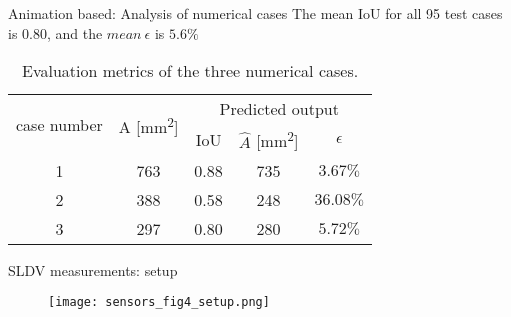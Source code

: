 \documentclass[10pt,aspectratio=169,dvipsnames]{beamer} %
\begin{document}
	\begin{frame}{Animation based: Analysis of numerical cases}
		The mean IoU for all 95 test cases is 0.80, and the \(mean\ \epsilon\) is \(5.6\%\)
		\begin{table}[!h]
			\centering
			\caption{Evaluation metrics of the three numerical cases.}
			\begin{tabular}{ccccc}
				\toprule[1.5pt]
				\multirow{2}{*}{case number} & \multicolumn{1}{c}{\multirow{2}{*}{A [mm\textsuperscript{2}]}} & \multicolumn{3}{c}{Predicted output} \\ 
				\cmidrule(lr){3-5} & & \multicolumn{1}{c}{IoU} & \multicolumn{1}{c}{\(\hat{A}\) [mm\textsuperscript{2}]} & \(\epsilon\) \\
				\midrule
				1 & 763 & \multicolumn{1}{c}{0.88} & \multicolumn{1}{c}{735} & \(3.67\%\) \\ 
				2 & 388 & \multicolumn{1}{c}{0.58} & \multicolumn{1}{c}{248} & \(36.08\%\) \\ 
				3 & 297 & \multicolumn{1}{c}{0.80} & \multicolumn{1}{c}{280} & \(5.72\%\) \\			 					
				\bottomrule[1.5pt]
			\end{tabular}	
			\label{tab:num_cases_}
		\end{table}			
	\end{frame}
	\begin{frame}{SLDV measurements: setup}
		\begin{figure}
			\texttt{[image: sensors\_fig4\_setup.png]}
		\end{figure}
	\end{frame}
	\setcounter{subfigure}{0}
\end{document}
